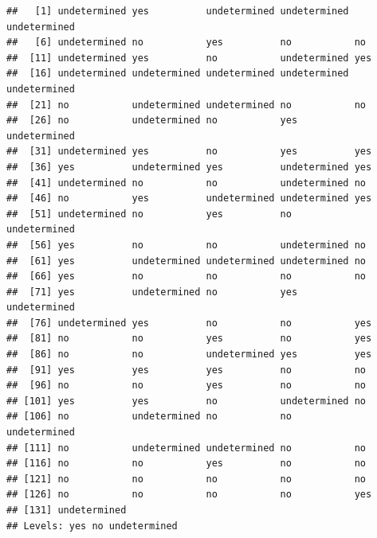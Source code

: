 \documentclass[]{book}
\newenvironment{Shaded}{\begin{snugshade}}{\end{snugshade}}
\newcommand{\KeywordTok}[1]{\textcolor[rgb]{0.13,0.29,0.53}{\textbf{#1}}}
\newcommand{\OperatorTok}[1]{\textcolor[rgb]{0.81,0.36,0.00}{\textbf{#1}}}
\newcommand{\NormalTok}[1]{#1}
\begin{document}
\begin{verbatim}
##   [1] undetermined yes          undetermined undetermined undetermined
##   [6] undetermined no           yes          no           no          
##  [11] undetermined yes          no           undetermined yes         
##  [16] undetermined undetermined undetermined undetermined undetermined
##  [21] no           undetermined undetermined no           no          
##  [26] no           undetermined no           yes          undetermined
##  [31] undetermined yes          no           yes          yes         
##  [36] yes          undetermined yes          undetermined yes         
##  [41] undetermined no           no           undetermined no          
##  [46] no           yes          undetermined undetermined yes         
##  [51] undetermined no           yes          no           undetermined
##  [56] yes          no           no           undetermined no          
##  [61] yes          undetermined undetermined undetermined no          
##  [66] yes          no           no           no           no          
##  [71] yes          undetermined no           yes          undetermined
##  [76] undetermined yes          no           no           yes         
##  [81] no           no           yes          no           yes         
##  [86] no           no           undetermined yes          yes         
##  [91] yes          yes          yes          no           no          
##  [96] no           no           yes          no           no          
## [101] yes          yes          no           undetermined no          
## [106] no           undetermined no           no           undetermined
## [111] no           undetermined undetermined no           no          
## [116] no           no           yes          no           no          
## [121] no           no           no           no           no          
## [126] no           no           no           no           yes         
## [131] undetermined
## Levels: yes no undetermined
\end{verbatim}

\begin{Shaded}
\end{Shaded}
\end{document}
